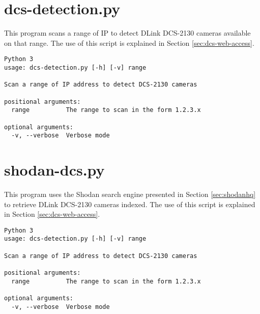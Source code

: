 \section{dcs-detection.py}

This program scans a range of IP to detect DLink DCS-2130 cameras available on that range.
The use of this script is explained in Section \ref{sec:dcs-web-access}.

\begin{verbatim}
Python 3
usage: dcs-detection.py [-h] [-v] range

Scan a range of IP address to detect DCS-2130 cameras

positional arguments:
  range          The range to scan in the form 1.2.3.x

optional arguments:
  -v, --verbose  Verbose mode
\end{verbatim}

\section{shodan-dcs.py}

This program uses the Shodan search engine presented in Section \ref{sec:shodanhq} to retrieve DLink DCS-2130 cameras indexed.
The use of this script is explained in Section \ref{sec:dcs-web-access}.

\begin{verbatim}
Python 3
usage: dcs-detection.py [-h] [-v] range

Scan a range of IP address to detect DCS-2130 cameras

positional arguments:
  range          The range to scan in the form 1.2.3.x

optional arguments:
  -v, --verbose  Verbose mode
\end{verbatim}